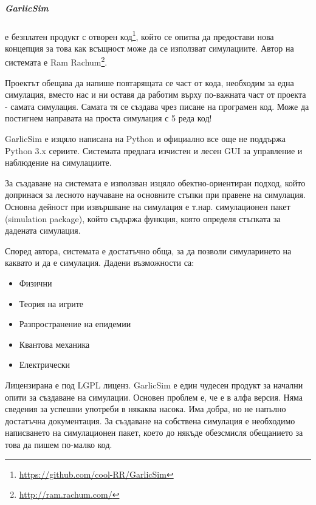 		\subparagraph{GarlicSim} е безплатен продукт с отворен код\footnote{\url{https://github.com/cool-RR/GarlicSim}}, 
			който се опитва да предостави нова концепция за това как всъщност може да се използват симулациите.
			Автор на системата е Ram Rachum\footnote{\url{http://ram.rachum.com/}}.														
			
			Проектът обещава да напише повтарящата се част от кода, необходим за една симулация, вместо нас и ни
			оставя да работим върху по-важната част от проекта - самата симулация. Самата тя се създава чрез 
			писане на програмен код. Може да постигнем направата на проста симулация с 5 реда код!   			
							
			GarlicSim е изцяло написана на Python и официално все още не поддържа Python 3.x сериите. 
			Системата предлага изчистен и лесен GUI за управление и наблюдение на симулациите. 			
		
			За създаване на системата е използван изцяло обектно-ориентиран подход, който допринася за лесното
			научаване на основните стъпки при правене на симулация. Основна дейност при извършване на симулация
			е т.нар. симулационен пакет (simulation package), който съдържа функция, която определя стъпката за
			дадената симулация.
		
			Според автора, системата е достатъчно обща, за да позволи симуларинето на каквато и да е симулация.
			Дадени възможности са:

				\begin{itemize}
				\item Физични
				\item Теория на игрите
				\item Разпространение на епидемии
				\item Квантова механика
				\item Електрически
			\end{itemize}								
			
			Лицензирана е под \ac{LGPL} лиценз. GarlicSim е един чудесен продукт за начални опити за създаване на симулации. 
			Основен проблем е, че е в алфа версия. Няма сведения за успешни употреби в някаква насока.
			Има добра, но не напълно достатъчна документация. За създаване на собствена симулация е необходимо
			написването на симулационен пакет, което до някъде обезсмисля обещанието за това да пишем по-малко код.
			\cite{GarlicSim}